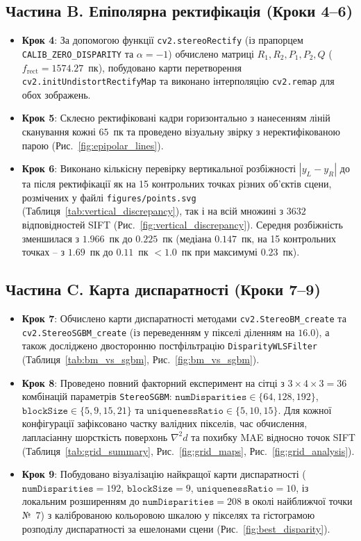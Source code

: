 \documentclass[14pt, a4paper]{extarticle}
\begin{document}
\subsection{Частина B. Епіполярна ректифікація (Кроки 4--6)}
\begin{itemize}
    \item \textbf{Крок 4}: За допомогою функції \texttt{cv2.stereoRectify} (із прапорцем \texttt{CALIB\_ZERO\_DISPARITY} та $\alpha = -1$) обчислено матриці $R_1, R_2, P_1, P_2, Q$ ($f_{\text{rect}} = 1574.27$~пк), побудовано карти перетворення \texttt{cv2.initUndistortRectifyMap} та виконано інтерполяцію \texttt{cv2.remap} для обох зображень.
    \item \textbf{Крок 5}: Склеєно ректифіковані кадри горизонтально з нанесенням ліній сканування кожні $65$~пк та проведено візуальну звірку з неректифікованою парою (Рис.~\ref{fig:epipolar_lines}).
    \item \textbf{Крок 6}: Виконано кількісну перевірку вертикальної розбіжності $|y_L - y_R|$ до та після ректифікації як на 15 контрольних точках різних об'єктів сцени, розмічених у файлі \texttt{figures/points.svg} (Таблиця~\ref{tab:vertical_discrepancy}), так і на всій множині з $3632$ відповідностей SIFT (Рис.~\ref{fig:vertical_discrepancy}). Середня розбіжність зменшилася з $1.966$~пк до $\mathbf{0.225}$~пк (медіана $\mathbf{0.147}$~пк, на 15 контрольних точках -- з $1.69$~пк до $\mathbf{0.11}$~пк $< 1.0$~пк при максимумі $0.23$~пк).
\end{itemize}

\subsection{Частина C. Карта диспаратності (Кроки 7--9)}
\begin{itemize}
    \item \textbf{Крок 7}: Обчислено карти диспаратності методами \texttt{cv2.StereoBM\_\allowbreak create} та \texttt{cv2.StereoSGBM\_\allowbreak create} (із переведенням у пікселі діленням на $16.0$), а також досліджено двосторонню постфільтрацію \texttt{DisparityWLSFilter} (Таблиця~\ref{tab:bm_vs_sgbm}, Рис.~\ref{fig:bm_vs_sgbm}).
    \item \textbf{Крок 8}: Проведено повний факторний експеримент на сітці з $3 \times 4 \times 3 = 36$ комбінацій параметрів \texttt{StereoSGBM}: $\texttt{numDisparities} \in \{64, 128, 192\}$, $\texttt{blockSize} \in \{5, 9, 15, 21\}$ та $\texttt{uniquenessRatio} \in \{5, 10, 15\}$. Для кожної конфігурації зафіксовано частку валідних пікселів, час обчислення, лапласіанну шорсткість поверхонь $\nabla^2 d$ та похибку MAE відносно точок SIFT (Таблиця~\ref{tab:grid_summary}, Рис.~\ref{fig:grid_maps}, Рис.~\ref{fig:grid_analysis}).
    \item \textbf{Крок 9}: Побудовано візуалізацію найкращої карти диспаратності ($\texttt{numDisparities} = 192$, $\texttt{blockSize} = 9$, $\texttt{uniquenessRatio} = 10$, із локальним розширенням до $\texttt{numDisparities} = 208$ в околі найближчої точки №~7) з каліброваною кольоровою шкалою у пікселях та гістограмою розподілу диспаратності за ешелонами сцени (Рис.~\ref{fig:best_disparity}).
\end{itemize}
\end{document}

